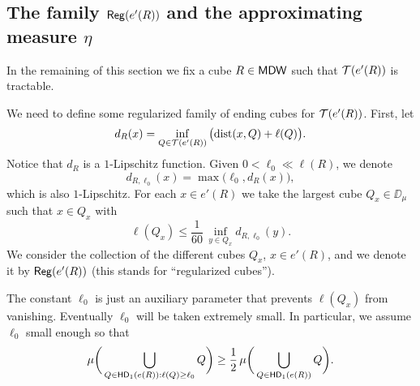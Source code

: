 
\subsection{The family \texorpdfstring{${\mathsf{Reg}}(e'(R))$}{Reg(e'(R))} and the approximating measure \texorpdfstring{$\eta$}{eta}}\label{sec6.2*}

In the remaining of this section we fix a cube $R\in{\mathsf{MDW}}$ such that ${\mathcal T}(e'(R))$ is tractable.

We need to define some regularized family of ending cubes for ${\mathcal T}(e'(R))$. 
First, let 
$$d_R(x) = \inf_{Q\in{\mathcal T}(e'(R))}\big({\rm dist}(x,Q) + \ell(Q)\big).$$
Notice that $d_R$ is a $1$-Lipschitz function. 
Given $0<\ell_0\ll\ell(R)$, we denote
\begin{equation}\label{eql00*23}
d_{R,\ell_0}(x) = \max\big(\ell_0,d_R(x)\big),
\end{equation}
which is also $1$-Lipschitz.
For each $x\in e'(R)$ we take the largest cube $Q_x\in\DD_\mu$ 
such that $x\in Q_x$ with
\begin{equation}\label{eqdefqx}
\ell(Q_x) \leq \frac1{60}\,\inf_{y\in Q_x} d_{R,\ell_0}(y).
\end{equation}
We consider the collection of the different cubes $Q_x$, $x\in e'(R)$, and we denote it by ${\mathsf{Reg}}(e'(R))$ (this stands for ``regularized cubes''). 

The constant $\ell_0$ is just an auxiliary parameter that prevents $\ell(Q_x)$ from vanishing.  Eventually $\ell_0$ will be taken extremely small. In particular, we assume $\ell_0$ small enough
so that 
\begin{equation}\label{eql00}
\mu\bigg(\bigcup_{Q\in{\mathsf{HD}}_1(e(R)):\ell(Q)\geq \ell_0} Q \bigg)\geq \frac12\,\mu\bigg(\bigcup_{Q\in{\mathsf{HD}}_1(e(R))} Q\bigg).
\end{equation}

